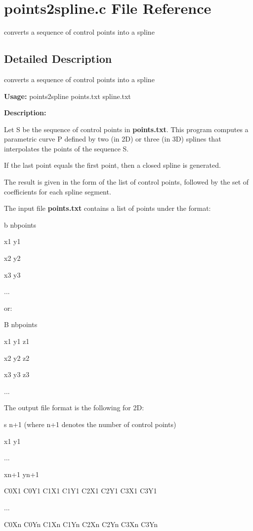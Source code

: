\section{points2spline.c File Reference}
\label{points2spline_8c}
converts a sequence of control points into a spline 



\subsection{Detailed Description}
converts a sequence of control points into a spline 

{\bf Usage:} points2spline points.txt spline.txt

{\bf Description:}

Let S be the sequence of control points in {\bf points.txt}. This program computes a parametric curve P defined by two (in 2D) or three (in 3D) splines that interpolates the points of the sequence S.

If the last point equals the first point, then a closed spline is generated.

The result is given in the form of the list of control points, followed by the set of coefficients for each spline segment.

The input file {\bf points.txt} contains a list of points under the format:

b nbpoints\par
 x1 y1\par
 x2 y2\par
 x3 y3\par
 ...\par


or:

B nbpoints\par
 x1 y1 z1\par
 x2 y2 z2\par
 x3 y3 z3\par
 ...\par


The output file format is the following for 2D:

s n+1 (where n+1 denotes the number of control points)\par
 x1 y1\par
 ...\par
 xn+1 yn+1\par
 C0X1 C0Y1 C1X1 C1Y1 C2X1 C2Y1 C3X1 C3Y1\par
 ...\par
 C0Xn C0Yn C1Xn C1Yn C2Xn C2Yn C3Xn C3Yn\par


